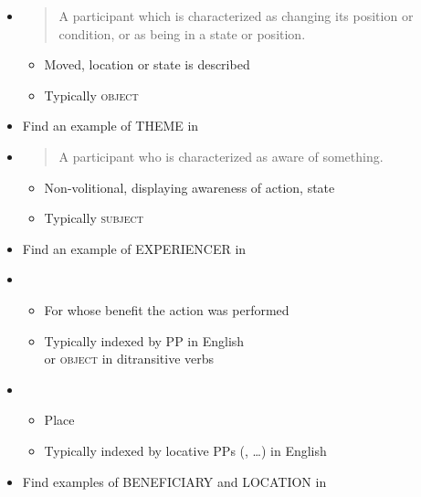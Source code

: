 \documentclass[a4paper,landscape,headrule,footrule,xetex]{foils}
\begin{document}
\begin{itemize}
\newpage
\item  {}
  \begin{quote}
     A participant which is characterized as changing its position or condition, or as
being in a state or position. 
  \end{quote}
  \begin{itemize}
  \item  Moved, location or state is described
  \item Typically \textsc{object}
\end{itemize}
\begin{exe}
  \ex {}
  \ex {}
  \ex {}
  \ex {}
  \ex *
\end{exe}
\item Find an example of THEME in \Story{}\task
\newpage

\item  {}
  \begin{quote}
    A participant who is characterized as aware of something.
  \end{quote}
  \begin{itemize}
  \item   Non-volitional, displaying awareness of action, state
  \item Typically \textsc{subject}
  \end{itemize}
  \begin{exe}
  \ex{}
  \ex{}
  \ex{}
\end{exe}
\item Find an example of EXPERIENCER in \Story{}\task
\newpage
\item  {}
  \begin{itemize}
  \item   For whose benefit the action was performed
  \item   Typically indexed by  PP in English
    \\ or \textsc{object} in ditransitive verbs
  \end{itemize}
  \begin{exe}
  \ex{}
  \ex{}
\end{exe}

\item  {}
  \begin{itemize}
  \item  Place
  \item Typically indexed by locative PPs (, \ldots) in English
  \end{itemize}
  \begin{exe}
  \ex{}
  \ex{}
\end{exe}
\item Find  examples of BENEFICIARY and LOCATION in \Story{}\task
\newpage  


\end{itemize}
\end{document}
